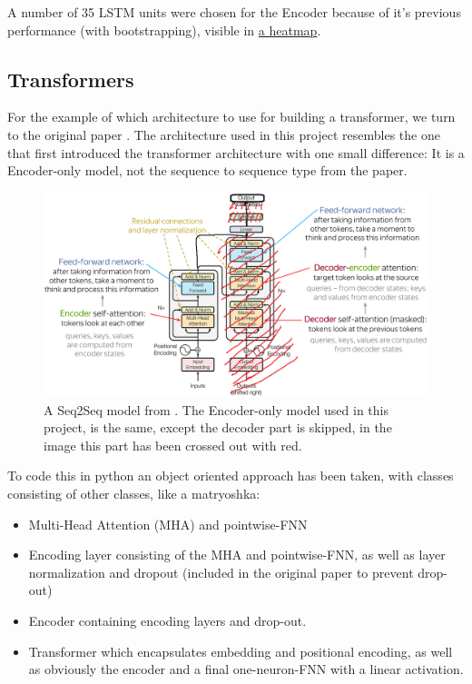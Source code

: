 \documentclass{article}
\begin{document}
A number of 35 LSTM units were chosen for the Encoder because of it's previous 
performance (with bootstrapping), visible in \href{https://github.com/AntonStantan/matura/blob/main/attentional-RNN/previousHeatmap.png}
{a heatmap}.
\newpage
\subsection{Transformers}

For the example of which architecture to use for building a transformer, we 
turn to the original paper \cite{vaswani2023attentionneed}. The architecture 
used in this project resembles the one that first introduced the transformer 
architecture with one small difference: It is a Encoder-only model, not the 
sequence to sequence type from the paper.

\begin{figure}[htbp]
    \centering
    \includegraphics[width=0.5\paperwidth]{images/transformerSeq2Seq.png}
    \caption{A Seq2Seq model from \cite{vaswani2023attentionneed}. The 
    Encoder-only model used in this project, is the same, except the decoder 
    part is skipped, in the image this part has been crossed out with red.}
    \label{fig:transformerSeq2Seq}
\end{figure}

To code this in python an object oriented approach has been taken, with 
classes consisting of other classes, like a matryoshka: 

\begin{itemize}
    \item Multi-Head Attention (MHA) and pointwise-FNN
    \item Encoding layer consisting of the MHA and pointwise-FNN, as well as 
layer normalization and dropout (included in the original paper to prevent 
drop-out)
    \item Encoder containing encoding layers and drop-out.
    \item Transformer which encapsulates embedding and positional encoding, 
as well as obviously the encoder and a final one-neuron-FNN with a linear 
activation.
\end{itemize}
\end{document}
